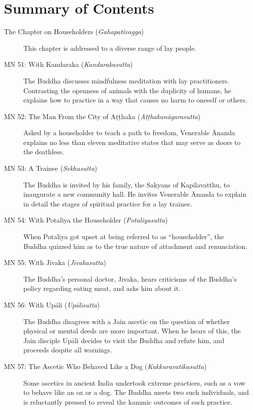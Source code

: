\documentclass[12pt,openany]{book}%
\begin{document}
\newpage

\setlength{\parindent}{1.5em}%
\tableofcontents
\newpage
\pagestyle{fancy}
%
\chapter*{Summary of Contents}

\begin{description}%
\item[The Chapter on Householders (\textit{\textsanskrit{Gahapativagga}})] This chapter is addressed to a diverse range of lay people.%
\item[MN 51: With Kandaraka (\textit{\textsanskrit{Kandarakasutta}})] The Buddha discusses mindfulness meditation with lay practitioners. Contrasting the openness of animals with the duplicity of humans, he explains how to practice in a way that causes no harm to oneself or others.%
\item[MN 52: The Man From the City of \textsanskrit{Aṭṭhaka} (\textit{\textsanskrit{Aṭṭhakanāgarasutta}})] Asked by a householder to teach a path to freedom, Venerable Ānanda explains no less than eleven meditative states that may serve as doors to the deathless.%
\item[MN 53: A Trainee (\textit{\textsanskrit{Sekhasutta}})] The Buddha is invited by his family, the Sakyans of Kapilavatthu, to inaugurate a new community hall. He invites Venerable Ānanda to explain in detail the stages of spiritual practice for a lay trainee.%
\item[MN 54: With Potaliya the Householder (\textit{\textsanskrit{Potaliyasutta}})] When Potaliya got upset at being referred to as “householder”, the Buddha quizzed him as to the true nature of attachment and renunciation.%
\item[MN 55: With \textsanskrit{Jīvaka} (\textit{\textsanskrit{Jīvakasutta}})] The Buddha’s personal doctor, \textsanskrit{Jīvaka}, hears criticisms of the Buddha’s policy regarding eating meat, and asks him about it.%
\item[MN 56: With \textsanskrit{Upāli} (\textit{\textsanskrit{Upālisutta}})] The Buddha disagrees with a Jain ascetic on the question of whether physical or mental deeds are more important. When he hears of this, the Jain disciple \textsanskrit{Upāli} decides to visit the Buddha and refute him, and proceeds despite all warnings.%
\item[MN 57: The Ascetic Who Behaved Like a Dog (\textit{\textsanskrit{Kukkuravatikasutta}})] Some ascetics in ancient India undertook extreme practices, such as a vow to behave like an ox or a dog. The Buddha meets two such individuals, and is reluctantly pressed to reveal the kammic outcomes of such practice.%

\end{description}
\end{document}
